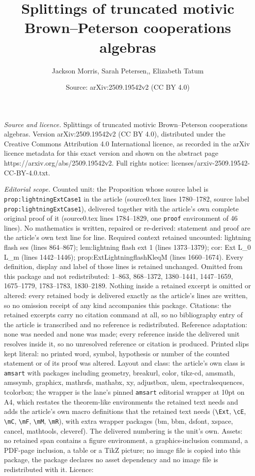 \documentclass[10pt,a4paper]{amsart}
\title[Splittings of truncated motivic Brown--Peterson cooperations]{Splittings of truncated motivic Brown--Peterson cooperations algebras}
\author{Jackson Morris, Sarah Petersen,, Elizabeth Tatum}
\date{Source: arXiv:2509.19542v2 (CC BY 4.0)}
\begin{document}
\maketitle

\noindent\emph{Source and licence.} Splittings of truncated motivic Brown--Peterson cooperations algebras. Version arXiv:2509.19542v2 (CC BY 4.0), distributed under the Creative Commons Attribution 4.0 International licence, as recorded in the arXiv licence metadata for this exact version and shown on the abstract page https://arxiv.org/abs/2509.19542v2. Full rights notice: licenses/arxiv-2509.19542-CC-BY-4.0.txt.\par\smallskip

\noindent\textit{Editorial scope.} Counted unit: the Proposition whose source label is \texttt{prop:lightningExtCase1} in the article (source0.tex lines 1780--1782, source label \texttt{prop:lightningExtCase1}), delivered together with the article's own complete original proof of it (source0.tex lines 1784--1829, one \texttt{proof} environment of 46 lines). No mathematics is written, repaired or re-derived: statement and proof are the article's own text line for line. Required context retained uncounted: lightning flash ses (lines 864--867); lem:lightning flash ext 1 (lines 1373--1379); cor: Ext L\_0 L\_m (lines 1442--1446); prop:ExtLightningflashKleqM (lines 1660--1674). Every definition, display and label of those lines is retained unchanged. Omitted from this package and not redistributed: 1--863, 868--1372, 1380--1441, 1447--1659, 1675--1779, 1783--1783, 1830--2189. Nothing inside a retained excerpt is omitted or altered: every retained body is delivered exactly as the article's lines are written, so no omission receipt of any kind accompanies this package. Citations: the retained excerpts carry no citation command at all, so no bibliography entry of the article is transcribed and no reference is redistributed. Reference adaptation: none was needed and none was made; every reference inside the delivered unit resolves inside it, so no unresolved reference or citation is produced. Printed slips kept literal: no printed word, symbol, hypothesis or number of the counted statement or of its proof was altered. Layout and class: the article's own class is \texttt{amsart} with packages including geometry, breakurl, color, tikz-cd, amsmath, amssymb, graphicx, mathrsfs, mathabx, xy, adjustbox, ulem, spectralsequences, tcolorbox; the wrapper is the lane's pinned \texttt{amsart} editorial wrapper at 10pt on A4, which restates the theorem-like environments the retained text needs and adds the article's own macro definitions that the retained text needs (\texttt{\textbackslash Ext}, \texttt{\textbackslash cE}, \texttt{\textbackslash mC}, \texttt{\textbackslash mF}, \texttt{\textbackslash mM}, \texttt{\textbackslash mR}), with extra wrapper packages (bm, bbm, dsfont, xspace, cancel, mathtools, cleveref). The delivered numbering is the unit's own. Assets: no retained span contains a figure environment, a graphics-inclusion command, a PDF-page inclusion, a table or a TikZ picture; no image file is copied into this package, the package declares no asset dependency and no image file is redistributed with it. Licence: 
\end{document}

